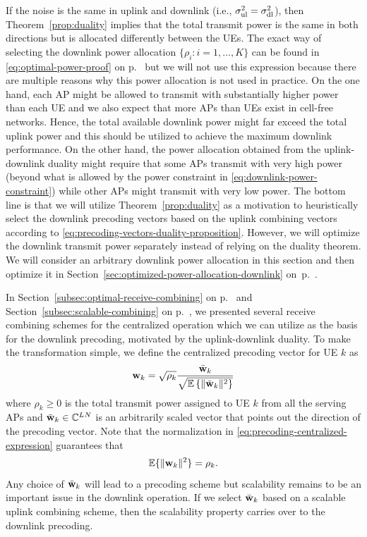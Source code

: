 If the noise is the same in uplink and downlink (i.e., $\sigma^2_{\mathrm{ul}} = \sigma^2_{\mathrm{dl}}$), then Theorem~\ref{prop:duality} implies that the total transmit power is the same in both directions but is allocated differently between the UEs. The exact way of selecting the downlink power allocation $\{\rho_i:i=1,\ldots,K\}$ can be found in \eqref{eq:optimal-power-proof} on p.~\pageref{eq:optimal-power-proof} but we will not use this expression because there are multiple reasons why this power allocation is not used in practice.
On the one hand, each AP might be allowed to transmit with substantially higher power than each UE and we also expect that more APs than UEs exist in cell-free networks. Hence, the total available downlink power might far exceed the total uplink power and this should be utilized to achieve the maximum downlink performance. On the other hand, the power allocation obtained from the uplink-downlink duality might require that some APs transmit with very high power (beyond what is allowed by the power constraint in \eqref{eq:downlink-power-constraint}) while other APs might transmit with very low power. 
The bottom line is that we will utilize Theorem~\ref{prop:duality} as a motivation to heuristically select the downlink precoding vectors based on the uplink combining vectors according to \eqref{eq:precoding-vectors-duality-proposition}. However, \linebreak we will optimize the downlink transmit power separately instead of relying on the duality theorem. We will consider an arbitrary downlink power allocation in this section and then optimize it in Section~\ref{sec:optimized-power-allocation-downlink} on~p.~\pageref{sec:optimized-power-allocation-downlink}.

\enlargethispage{\baselineskip} 

In Section~\ref{subsec:optimal-receive-combining} on p.~\pageref{subsec:optimal-receive-combining} and Section~\ref{subsec:scalable-combining} on p.~\pageref{subsec:scalable-combining}, we presented several receive combining schemes for the centralized operation which we can utilize as the basis for the downlink precoding, motivated by the uplink-downlink duality. 
To make the transformation simple, we define the centralized precoding vector for UE $k$ as
	\begin{equation} \label{eq:precoding-centralized-expression}
	\mathbf{w}_k = \sqrt{\rho_k} \frac{\bar{\mathbf{w}}_k}{\sqrt{\mathbb{E} \left\{ \| \bar{\mathbf{w}}_k \|^2 \right\} }} 
	\end{equation}
where $\rho_k \geq 0 $ is the total transmit power assigned to UE $k$ from all the serving APs and $\bar{\mathbf{w}}_k \in \mathbb{C}^{LN}$ is an arbitrarily scaled vector that points out the direction of the precoding vector. Note that the normalization in \eqref{eq:precoding-centralized-expression} guarantees that 
\begin{equation}
\mathbb{E} \{ \| \mathbf{w}_k \|^2 \} = \rho_k.
\end{equation}
Any choice of $\bar{\mathbf{w}}_k$ will lead to a precoding scheme but scalability remains to be an important issue in the downlink operation. If we select $\bar{\mathbf{w}}_k$ based on a scalable uplink combining scheme, then the scalability property carries over to the downlink precoding. 

